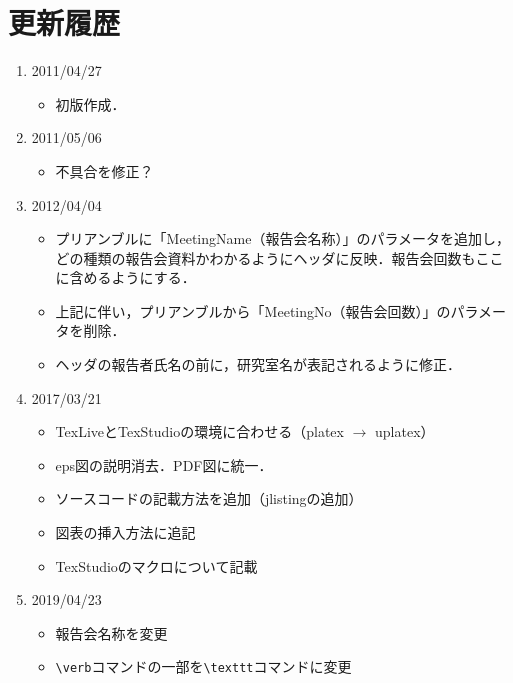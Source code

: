 \documentclass[uplatex]{jsarticle}
\begin{document}
\section{更新履歴}
\begin{enumerate}
\item 2011/04/27
\begin{itemize}
\item 初版作成．
\end{itemize}
%
\item 2011/05/06
\begin{itemize}
\item 不具合を修正？
\end{itemize}
%
\item 2012/04/04
\begin{itemize}
\item プリアンブルに「MeetingName（報告会名称）」のパラメータを追加し，どの種類の報告会資料かわかるようにヘッダに反映．報告会回数もここに含めるようにする．
\item 上記に伴い，プリアンブルから「MeetingNo（報告会回数）」のパラメータを削除．
\item ヘッダの報告者氏名の前に，研究室名が表記されるように修正．
\end{itemize}
%
\item 2017/03/21
\begin{itemize}
	\item TexLiveとTexStudioの環境に合わせる（platex $\to$ uplatex）
	\item eps図の説明消去．PDF図に統一．
	\item ソースコードの記載方法を追加（jlistingの追加）
	\item 図表の挿入方法に追記
	\item TexStudioのマクロについて記載
\end{itemize}
%
\item 2019/04/23
\begin{itemize}
	\item 報告会名称を変更
	\item \verb|\verb|コマンドの一部を\verb|\texttt|コマンドに変更
\end{itemize}
%
\end{enumerate}
\end{document}
